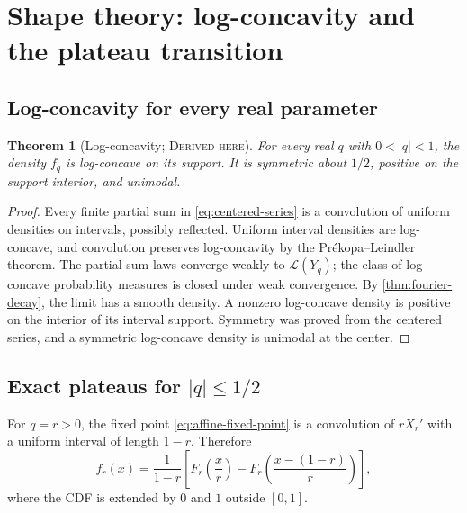 \documentclass[11pt,oneside]{article}
\newtheorem{theorem}{Theorem}[section]
\theoremstyle{definition}
\theoremstyle{remark}
\newcommand{\Law}{\mathcal L}
\newcommand{\Derived}{\textsc{Derived here}}
\begin{document}
\section{Shape theory: log-concavity and the plateau transition}

\subsection{Log-concavity for every real parameter}
\begin{theorem}[Log-concavity; \Derived]\label{thm:logconcave}
For every real \(q\) with \(0<|q|<1\), the density \(f_q\) is log-concave on its
support.  It is symmetric about \(1/2\), positive on the support interior, and
unimodal.
\end{theorem}

\begin{proof}
Every finite partial sum in \eqref{eq:centered-series} is a convolution of
uniform densities on intervals, possibly reflected.  Uniform interval densities
are log-concave, and convolution preserves log-concavity by the
Pr\'ekopa--Leindler theorem.  The partial-sum laws converge weakly to
\(\Law(Y_q)\); the class of log-concave probability measures is closed under
weak convergence.  By \cref{thm:fourier-decay}, the limit has a smooth density.
A nonzero log-concave density is positive on the interior of its interval
support.  Symmetry was proved from the centered series, and a symmetric
log-concave density is unimodal at the center.
\end{proof}

\subsection{Exact plateaus for \texorpdfstring{\(|q|\le1/2\)}{|q|<=1/2}}
For \(q=r>0\), the fixed point \eqref{eq:affine-fixed-point} is a convolution
of \(rX_r'\) with a uniform interval of length \(1-r\).  Therefore
\begin{equation}\label{eq:density-cdf-positive}
 f_r(x)=\frac1{1-r}
 \left[
 F_r\!\left(\frac xr\right)
 -F_r\!\left(\frac{x-(1-r)}r\right)
 \right],
\end{equation}
where the CDF is extended by \(0\) and \(1\) outside \([0,1]\).
\end{document}
